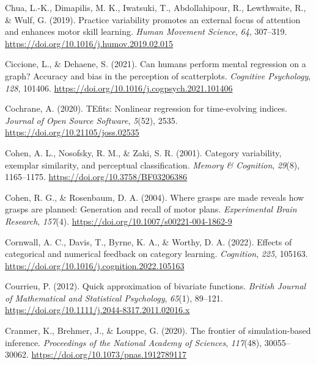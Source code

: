 \documentclass[
  11pt,
  letterpaper,
]{article}
\newlength{\cslhangindent}
\newenvironment{CSLReferences}[2] %
 {\begin{list}{}{%
  \setlength{\itemindent}{0pt}
  \setlength{\leftmargin}{0pt}
  \setlength{\parsep}{0pt}
  \ifodd #1
   \setlength{\leftmargin}{\cslhangindent}
   \setlength{\itemindent}{-1\cslhangindent}
  \fi
  \setlength{\itemsep}{#2\baselineskip}}}
 {\end{list}}
\begin{document}
\begin{CSLReferences}{1}{0}
Chua, L.-K., Dimapilis, M. K., Iwatsuki, T., Abdollahipour, R.,
Lewthwaite, R., \& Wulf, G. (2019). Practice variability promotes an
external focus of attention and enhances motor skill learning.
\emph{Human Movement Science}, \emph{64}, 307--319.
\url{https://doi.org/10.1016/j.humov.2019.02.015}

Ciccione, L., \& Dehaene, S. (2021). Can humans perform mental
regression on a graph? {Accuracy} and bias in the perception of
scatterplots. \emph{Cognitive Psychology}, \emph{128}, 101406.
\url{https://doi.org/10.1016/j.cogpsych.2021.101406}

Cochrane, A. (2020). {TEfits}: {Nonlinear} regression for time-evolving
indices. \emph{Journal of Open Source Software}, \emph{5}(52), 2535.
\url{https://doi.org/10.21105/joss.02535}

Cohen, A. L., Nosofsky, R. M., \& Zaki, S. R. (2001). Category
variability, exemplar similarity, and perceptual classification.
\emph{Memory \& Cognition}, \emph{29}(8), 1165--1175.
\url{https://doi.org/10.3758/BF03206386}

Cohen, R. G., \& Rosenbaum, D. A. (2004). Where grasps are made reveals
how grasps are planned: Generation and recall of motor plans.
\emph{Experimental Brain Research}, \emph{157}(4).
\url{https://doi.org/10.1007/s00221-004-1862-9}

Cornwall, A. C., Davis, T., Byrne, K. A., \& Worthy, D. A. (2022).
Effects of categorical and numerical feedback on category learning.
\emph{Cognition}, \emph{225}, 105163.
\url{https://doi.org/10.1016/j.cognition.2022.105163}

Courrieu, P. (2012). Quick approximation of bivariate functions.
\emph{British Journal of Mathematical and Statistical Psychology},
\emph{65}(1), 89--121.
\url{https://doi.org/10.1111/j.2044-8317.2011.02016.x}

Cranmer, K., Brehmer, J., \& Louppe, G. (2020). The frontier of
simulation-based inference. \emph{Proceedings of the National Academy of
Sciences}, \emph{117}(48), 30055--30062.
\url{https://doi.org/10.1073/pnas.1912789117}


\end{CSLReferences}
\end{document}
